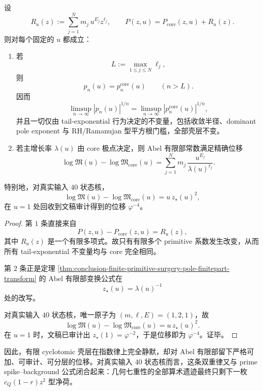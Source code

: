 \begin{theorem}\label{thm:conclusion-finite-cyclotomic-shell-double-law}
设
\[
R_u(z):=\sum_{j=1}^{N}m_j\,u^{E_j}z^{\ell_j},
\qquad
P(z,u)=P_{\mathrm{core}}(z,u)+R_u(z).
\]
则对每个固定的 \(u\) 都成立：
\begin{enumerate}
  \item 若
  \[
  L:=\max_{1\le j\le N}\ell_j,
  \]
  则
  \[
  p_n(u)=p_n^{\mathrm{core}}(u)\qquad (n>L).
  \]
  因而
  \[
  \limsup_{n\to\infty}|p_n(u)|^{1/n}
  =
  \limsup_{n\to\infty}|p_n^{\mathrm{core}}(u)|^{1/n},
  \]
  并且一切仅由 tail-exponential 行为决定的不变量，包括收敛半径、dominant pole exponent 与 RH/Ramanujan 型平方根门槛，全部壳层不变。
  \item 若主增长率 \(\lambda(u)\) 由 core 极点决定，则 Abel 有限部常数满足精确位移
  \[
  \log\mathfrak M(u)-\log\mathfrak M_{\mathrm{core}}(u)
  =
  \sum_{j=1}^{N}m_j\,\frac{u^{E_j}}{\lambda(u)^{\ell_j}}.
  \]
\end{enumerate}
特别地，对真实输入 \(40\) 状态核，
\[
\log\mathfrak M(u)-\log\mathfrak M_{\mathrm{core}}(u)=u\,z_\star(u)^2,
\]
在 \(u=1\) 处回收到文稿审计得到的位移 \(\varphi^{-4}\)。
\end{theorem}
\begin{proof}
第 \(1\) 条直接来自
\[
P(z,u)-P_{\mathrm{core}}(z,u)=R_u(z),
\]
其中 \(R_u(z)\) 是一个有限多项式。故只有有限多个 primitive 系数发生改变，从而所有 tail-exponential 不变量均与 core 完全相同。

第 \(2\) 条正是定理 \ref{thm:conclusion-finite-primitive-surgery-pole-finitepart-transform} 的 Abel 有限部变换公式在
\[
z_\star(u)=\lambda(u)^{-1}
\]
处的改写。

对真实输入 \(40\) 状态核，唯一原子为 \((m,\ell,E)=(1,2,1)\)，故
\[
\log\mathfrak M(u)-\log\mathfrak M_{\mathrm{core}}(u)=u\,z_\star(u)^2.
\]
在 \(u=1\) 时，文稿已审计出 \(z_\star(1)=\varphi^{-2}\)，于是位移即为 \(\varphi^{-4}\)。证毕。
\end{proof}

\noindent
因此，有限 cyclotomic 壳层在指数律上完全静默，却对 Abel 有限部留下严格可加、可审计、可分层的位移。对真实输入 \(40\) 状态核而言，这条双重律又与 prime spike--background 公式闭合起来：几何七重性的全部算术遗迹最终只剩下一枚 \(c_Q(1-r)z^2\) 型净荷。
